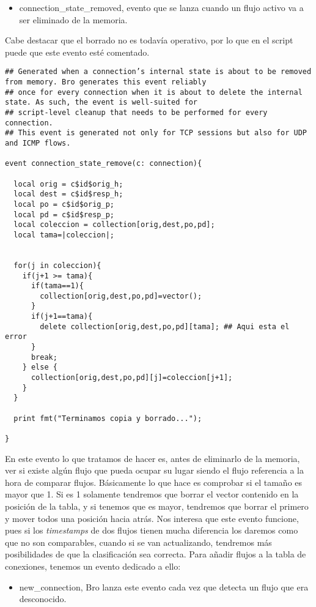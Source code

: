 \begin{itemize}
\item connection\_state\_removed, evento que se lanza cuando un flujo activo va a ser 
eliminado de la memoria.
\end{itemize}

\noindent Cabe destacar que el borrado no es todavía operativo, por lo que en el script puede 
que este evento esté comentado.
\intro
\begin{lstlisting}[style=Codigoc]
## Generated when a connection’s internal state is about to be removed from memory. Bro generates this event reliably
## once for every connection when it is about to delete the internal state. As such, the event is well-suited for
## script-level cleanup that needs to be performed for every connection.
## This event is generated not only for TCP sessions but also for UDP and ICMP flows.

event connection_state_remove(c: connection){

  local orig = c$id$orig_h;
  local dest = c$id$resp_h;
  local po = c$id$orig_p;
  local pd = c$id$resp_p;
  local coleccion = collection[orig,dest,po,pd];
  local tama=|coleccion|;


  for(j in coleccion){
    if(j+1 >= tama){
      if(tama==1){
        collection[orig,dest,po,pd]=vector();
      }
      if(j+1==tama){
        delete collection[orig,dest,po,pd][tama]; ## Aqui esta el error
      }
      break;
    } else {
      collection[orig,dest,po,pd][j]=coleccion[j+1];
    }
  }

  print fmt("Terminamos copia y borrado...");

}

\end{lstlisting}

\noindent En este evento lo que tratamos de hacer es, antes de eliminarlo de 
la memoria, ver si existe algún flujo que pueda ocupar su lugar 
siendo el flujo referencia a la hora de comparar flujos. Básicamente 
lo que hace es comprobar si el tamaño es mayor que 1. Si es 1 solamente 
tendremos que borrar el vector contenido en la posición de la tabla, 
y si tenemos que es mayor, tendremos que borrar el primero y mover todos 
una posición hacia atrás. Nos interesa que este evento funcione, pues 
si los \textit{timestamps} de dos flujos tienen mucha diferencia los daremos 
como que no son comparables, cuando si se van actualizando, tendremos más 
posibilidades de que la clasificación sea correcta.
\intro
Para añadir flujos a la tabla de conexiones, tenemos un evento 
dedicado a ello:
\intro
\begin{itemize}
\item new\_connection, Bro lanza este evento cada vez que detecta un flujo que era desconocido.
\end{itemize}


